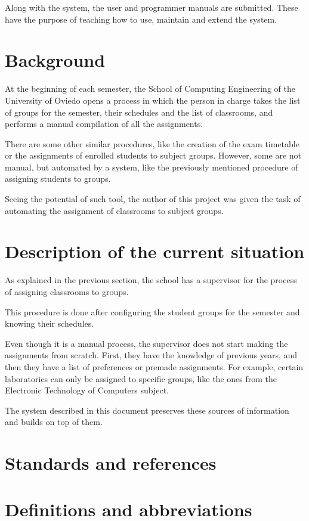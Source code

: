 Along with the system, the user and programmer manuals are submitted. These have the purpose of teaching how to use, maintain and extend the system.

\section{Background}

At the beginning of each semester, the School of Computing Engineering of the University of Oviedo opens a process in which the person in charge takes the list of groups for the semester, their schedules and the list of classrooms, and performs a manual compilation of all the assignments.

There are some other similar procedures, like the creation of the exam timetable or the assignments of enrolled students to subject groups. However, some are not manual, but automated by a system, like the previously mentioned procedure of assigning students to groups.

Seeing the potential of such tool, the author of this project was given the task of automating the assignment of classrooms to subject groups. 

\section{Description of the current situation}

As explained in the previous section, the school has a supervisor for the process of assigning classrooms to groups.

This procedure is done after configuring the student groups for the semester and knowing their schedules.

Even though it is a manual process, the supervisor does not start making the assignments from scratch. First, they have the knowledge of previous years, and then they have a list of preferences or premade assignments. For example, certain laboratories can only be assigned to specific groups, like the ones from the Electronic Technology of Computers subject.

The system described in this document preserves these sources of information and builds on top of them.

\section{Standards and references}
\section{Definitions and abbreviations}
